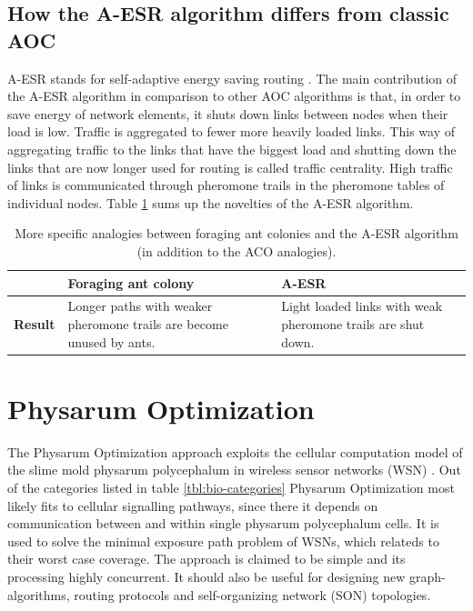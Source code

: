 \documentclass[cameraready]{IWORK2014}
\begin{document}
\subsection{How the A-ESR algorithm differs from classic AOC}
A-ESR stands for self-adaptive energy saving routing \cite{kim2012ant}. The main contribution of the A-ESR algorithm in comparison to other AOC algorithms is that, in order to save energy of network elements, it shuts down links between nodes when their load is low. Traffic is aggregated to fewer more heavily loaded links. This way of aggregating traffic to the links that have the biggest load and shutting down the links that are now longer used for routing is called traffic centrality. High traffic of links is communicated through pheromone trails in the pheromone tables of individual nodes. Table \ref{tbl:analogies_a-esr} sums up the novelties of the A-ESR algorithm.

\begin{table}
	\begin{tabularx}{0.90\textwidth}{|X|X|X|}
		\hline & \textbf{Foraging ant colony} & \textbf{A-ESR} \\ \hline	
		\textbf{Result} & Longer paths with weaker pheromone trails are become unused by ants. & Light loaded links with weak pheromone trails are shut down. \\ \hline
	\end{tabularx}
	\caption{More specific analogies between foraging ant colonies and the A-ESR algorithm (in addition to the ACO analogies).}
	\label{tbl:analogies_a-esr}
\end{table}

\section{Physarum Optimization}
The Physarum Optimization approach exploits the cellular computation model of the slime mold physarum polycephalum in wireless sensor networks (WSN) \cite{liu2012physarum}. Out of the categories listed in table \ref{tbl:bio-categories} Physarum Optimization most likely fits to cellular signalling pathways, since there it depends on communication between and within single physarum polycephalum cells. It is used to solve the minimal exposure path problem of WSNs, which relateds to their worst case coverage. The approach is claimed to be simple and its processing highly concurrent. It should also be useful for designing new graph-algorithms, routing protocols and self-organizing network (SON) topologies.
\end{document}
